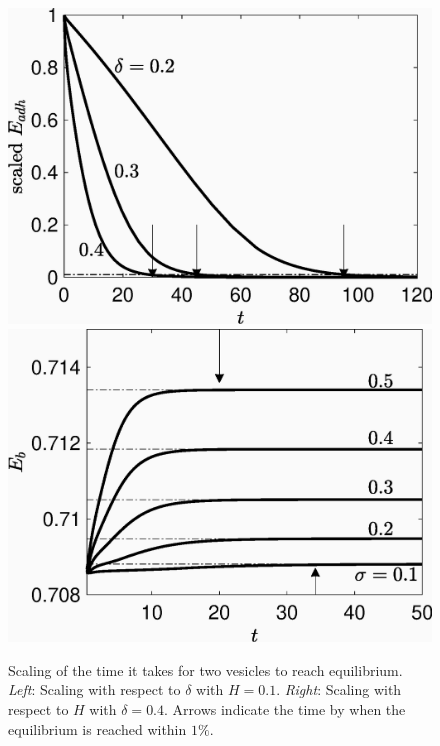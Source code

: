 \documentclass[prf,superscriptaddress,showpacs]{revtex4-1}
\begin{document}
\begin{figure}
\includegraphics[keepaspectratio=true,scale=0.4]{figs/Dec13a_time_scaling01.eps}
\includegraphics[keepaspectratio=true,scale=0.4]{figs/Dec13a_time_scaling02.eps}
\caption{\label{fig:qflow00} Scaling of the time it takes for two
  vesicles to reach equilibrium. {\em Left}: Scaling with respect to
  $\delta$ with $H=0.1$.  {\em Right}: Scaling with respect to $H$ with
  $\delta = 0.4$. Arrows indicate the time by when the equilibrium is
  reached within $1\%$.}
\end{figure}
\end{document}
